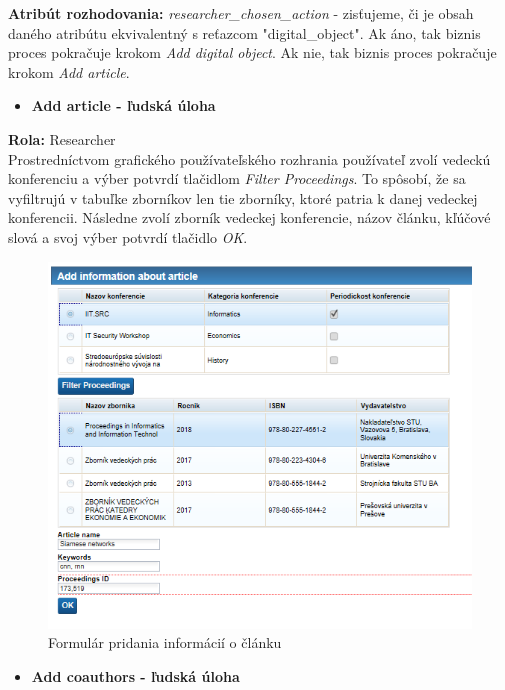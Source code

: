 \documentclass[10pt,oneside,slovak,a4paper]{article}
\begin{document}
\textbf{Atribút rozhodovania:} \textit{researcher\_chosen\_action} - zisťujeme, či je obsah daného atribútu ekvivalentný s reťazcom "digital\_object". Ak áno, tak biznis proces pokračuje krokom \textit{Add digital object}. Ak nie, tak biznis proces pokračuje krokom \textit{Add article}.

\begin{itemize}
\item \textbf{Add article - ľudská úloha}
\end{itemize}

\textbf{Rola:} Researcher\\

Prostredníctvom grafického používateľského rozhrania používateľ zvolí vedeckú konferenciu a výber potvrdí tlačidlom \textit{Filter Proceedings}. To spôsobí, že sa vyfiltrujú v tabuľke zborníkov len tie zborníky, ktoré patria k danej vedeckej konferencii. Následne zvolí zborník vedeckej konferencie, názov článku, kľúčové slová a svoj výber potvrdí tlačidlo \textit{OK}.

\begin{figure} [H]
\centering
\includegraphics[scale=0.4]{forms/insert_article.png} 
\caption{Formulár pridania informácií o článku}
\end{figure}

\begin{itemize}
\item \textbf{Add coauthors - ľudská úloha}
\end{itemize}
\end{document}
